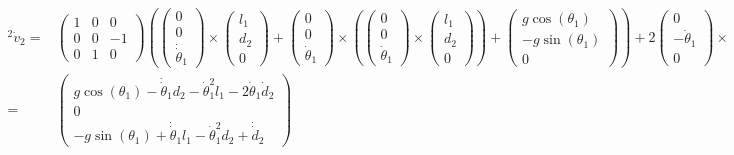 \documentclass[10pt,a4paper]{article}
\begin{document}
\begin{align*}
  {}^{2}\dot{v}_{2} = & \begin{pmatrix}
    1 & 0 & 0\\
    0 & 0 & -1\\
    0 & 1 & 0
  \end{pmatrix} \left( \begin{pmatrix}
    0\\0\\\dot{\dot{\theta}}_{1}
  \end{pmatrix} \times \begin{pmatrix}
    l_{1}\\d_{2}\\0
  \end{pmatrix} + \begin{pmatrix}
    0\\0\\\dot{\theta}_{1}
  \end{pmatrix} \times \left( \begin{pmatrix}
      0\\0\\\dot{\theta}_{1}
    \end{pmatrix} \times \begin{pmatrix}
      l_{1}\\d_{2}\\0
    \end{pmatrix} \right) + \begin{pmatrix}
    g\cos(\theta_{1})\\-g\sin(\theta_{1})\\0
  \end{pmatrix} \right) + 2 \begin{pmatrix}
  0\\-\dot{\theta}_{1}\\0
\end{pmatrix} \times \begin{pmatrix}
  0\\0\\\dot{d}_{2}
\end{pmatrix} + \begin{pmatrix}
  0\\0\\\dot{\dot{d}}_{2}
\end{pmatrix}\\
  = & \begin{pmatrix}
    g\cos(\theta_{1}) - \dot{\dot{\theta}}_{1}d_{2} - \dot{\theta}_{1}^{2}l_{1} - 2\dot{\theta}_{1}\dot{d}_{2}\\
    0\\
    -g\sin(\theta_{1}) + \dot{\dot{\theta}}_{1}l_{1} - \dot{\theta}_{1}^{2}d_{2} + \dot{\dot{d}}_{2}
  \end{pmatrix}
\end{align*}
\end{document}
